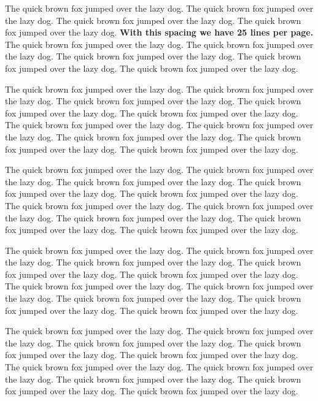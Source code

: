 \documentclass[
  12pt]{article}
\begin{document}
The quick brown fox jumped over the lazy dog. The quick brown fox jumped
over the lazy dog. The quick brown fox jumped over the lazy dog. The
quick brown fox jumped over the lazy dog. \textbf{With this spacing we
have 25 lines per page.} The quick brown fox jumped over the lazy dog.
The quick brown fox jumped over the lazy dog. The quick brown fox jumped
over the lazy dog. The quick brown fox jumped over the lazy dog. The
quick brown fox jumped over the lazy dog.

The quick brown fox jumped over the lazy dog. The quick brown fox jumped
over the lazy dog. The quick brown fox jumped over the lazy dog. The
quick brown fox jumped over the lazy dog. The quick brown fox jumped
over the lazy dog. The quick brown fox jumped over the lazy dog. The
quick brown fox jumped over the lazy dog. The quick brown fox jumped
over the lazy dog. The quick brown fox jumped over the lazy dog. The
quick brown fox jumped over the lazy dog.

The quick brown fox jumped over the lazy dog. The quick brown fox jumped
over the lazy dog. The quick brown fox jumped over the lazy dog. The
quick brown fox jumped over the lazy dog. The quick brown fox jumped
over the lazy dog. The quick brown fox jumped over the lazy dog. The
quick brown fox jumped over the lazy dog. The quick brown fox jumped
over the lazy dog. The quick brown fox jumped over the lazy dog. The
quick brown fox jumped over the lazy dog.

The quick brown fox jumped over the lazy dog. The quick brown fox jumped
over the lazy dog. The quick brown fox jumped over the lazy dog. The
quick brown fox jumped over the lazy dog. The quick brown fox jumped
over the lazy dog. The quick brown fox jumped over the lazy dog. The
quick brown fox jumped over the lazy dog. The quick brown fox jumped
over the lazy dog. The quick brown fox jumped over the lazy dog. The
quick brown fox jumped over the lazy dog.

\addtolength{\textheight}{-.5in}%

\addtolength{\textheight}{.2in}%

The quick brown fox jumped over the lazy dog. The quick brown fox jumped
over the lazy dog. The quick brown fox jumped over the lazy dog. The
quick brown fox jumped over the lazy dog. The quick brown fox jumped
over the lazy dog. The quick brown fox jumped over the lazy dog. The
quick brown fox jumped over the lazy dog. The quick brown fox jumped
over the lazy dog. The quick brown fox jumped over the lazy dog. The
quick brown fox jumped over the lazy dog.
\end{document}
